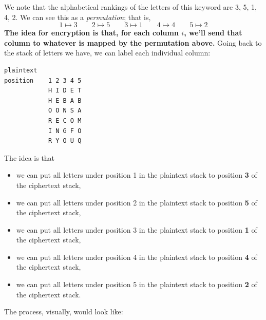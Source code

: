 \documentclass[letterpaper]{article}
\newcommand{\0}{\mathbf{0}}
\begin{document}
\begin{mdframed}[]
\begin{center}
    \end{center}
    We note that the alphabetical rankings of the letters of this keyword are 3, 5, 1, 4, 2. We can see this as a \emph{permutation}; that is, 
    \[1 \mapsto 3 \qquad 2 \mapsto 5 \qquad 3 \mapsto 1 \qquad 4 \mapsto 4 \qquad 5 \mapsto 2\]
    \textbf{The idea for encryption is that, for each column $i$, we'll send that column to whatever is mapped by the permutation above.} Going back to the stack of letters we have, we can label each individual column:
    \begin{mdframed}
        \begin{verbatim}
plaintext 
position    1 2 3 4 5
            H I D E T
            H E B A B
            O O N S A
            R E C O M
            I N G F O
            R Y O U Q\end{verbatim}
    \end{mdframed}
    The idea is that 
    \begin{itemize}
        \item we can put all letters under position 1 in the plaintext stack to position \textbf{3} of the ciphertext stack, 
        \item we can put all letters under position 2 in the plaintext stack to position \textbf{5} of the ciphertext stack, 
        \item we can put all letters under position 3 in the plaintext stack to position \textbf{1} of the ciphertext stack, 
        \item we can put all letters under position 4 in the plaintext stack to position \textbf{4} of the ciphertext stack, 
        \item we can put all letters under position 5 in the plaintext stack to position \textbf{2} of the ciphertext stack.
    \end{itemize}
    The process, visually, would look like: 
    \begin{center}

\end{center}
\end{mdframed}
\end{document}
